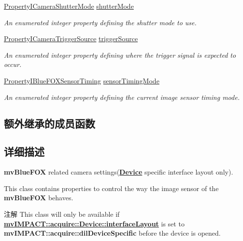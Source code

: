 \begin{DoxyCompactItemize}
\hyperlink{group___device_specific_interface_gae67620addf31f8c9a17c46d8a7e5464a}{Property\+I\+Camera\+Shutter\+Mode} \hyperlink{classmv_i_m_p_a_c_t_1_1acquire_1_1_camera_settings_blue_f_o_x_a3cd4e31b70fbc2c296fc2532202c7b49}{shutter\+Mode}
\begin{DoxyCompactList}\small\item\em An enumerated integer property defining the shutter mode to use. \end{DoxyCompactList}\item 
\hyperlink{group___device_specific_interface_ga40354af1fd85b454ec1b4e5ca007755d}{Property\+I\+Camera\+Trigger\+Source} \hyperlink{classmv_i_m_p_a_c_t_1_1acquire_1_1_camera_settings_blue_f_o_x_ad9f52f05612fa050ca3ae507e340d8d9}{trigger\+Source}
\begin{DoxyCompactList}\small\item\em An enumerated integer property defining where the trigger signal is expected to occur. \end{DoxyCompactList}\item 
\hyperlink{group___device_specific_interface_ga45fd35a32780ef2617233fe593eb9c1f}{Property\+I\+Blue\+F\+O\+X\+Sensor\+Timing} \hyperlink{classmv_i_m_p_a_c_t_1_1acquire_1_1_camera_settings_blue_f_o_x_a82207f8af714d74c943d0cc2725cb7c8}{sensor\+Timing\+Mode}
\begin{DoxyCompactList}\small\item\em An enumerated integer property defining the current image sensor timing mode. \end{DoxyCompactList}\end{DoxyCompactItemize}
\subsection*{额外继承的成员函数}


\subsection{详细描述}
{\bfseries mv\+Blue\+F\+O\+X} related camera settings({\bfseries \hyperlink{classmv_i_m_p_a_c_t_1_1acquire_1_1_device}{Device}} specific interface layout only). 

This class contains properties to control the way the image sensor of the {\bfseries mv\+Blue\+F\+O\+X} behaves.

\begin{DoxyNote}{注解}
This class will only be available if {\bfseries \hyperlink{classmv_i_m_p_a_c_t_1_1acquire_1_1_device_ab4dd0ecc9d456bb5ddc01d844c9d6f2d}{mv\+I\+M\+P\+A\+C\+T\+::acquire\+::\+Device\+::interface\+Layout}} is set to {\bfseries mv\+I\+M\+P\+A\+C\+T\+::acquire\+::dil\+Device\+Specific} before the device is opened. 
\end{DoxyNote}


